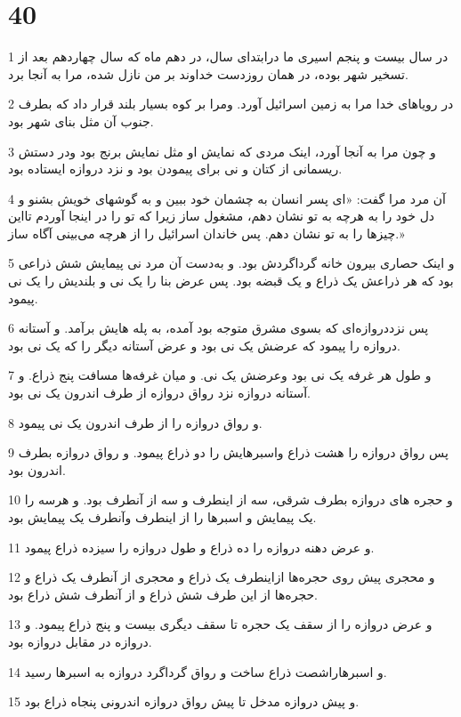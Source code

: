 \chapter{40}

\par 1 در سال بیست و پنجم اسیری ما درابتدای سال، در دهم ماه که سال چهاردهم بعد از تسخیر شهر بوده، در همان روزدست خداوند بر من نازل شده، مرا به آنجا برد.
\par 2 در رویاهای خدا مرا به زمین اسرائیل آورد. ومرا بر کوه بسیار بلند قرار داد که بطرف جنوب آن مثل بنای شهر بود.
\par 3 و چون مرا به آنجا آورد، اینک مردی که نمایش او مثل نمایش برنج بود ودر دستش ریسمانی از کتان و نی برای پیمودن بود و نزد دروازه ایستاده بود.
\par 4 آن مرد مرا گفت: «ای پسر انسان به چشمان خود ببین و به گوشهای خویش بشنو و دل خود را به هرچه به تو نشان دهم، مشغول ساز زیرا که تو را در اینجا آوردم تااین چیزها را به تو نشان دهم. پس خاندان اسرائیل را از هر‌چه می‌بینی آگاه ساز.»
\par 5 و اینک حصاری بیرون خانه گرداگردش بود. و به‌دست آن مرد نی پیمایش شش ذراعی بود که هر ذراعش یک ذراع و یک قبضه بود. پس عرض بنا را یک نی و بلندیش را یک نی پیمود.
\par 6 پس نزددروازه‌ای که بسوی مشرق متوجه بود آمده، به پله هایش برآمد. و آستانه دروازه را پیمود که عرضش یک نی بود و عرض آستانه دیگر را که یک نی بود.
\par 7 و طول هر غرفه یک نی بود وعرضش یک نی. و میان غرفه‌ها مسافت پنج ذراع. و آستانه دروازه نزد رواق دروازه از طرف اندرون یک نی بود.
\par 8 و رواق دروازه را از طرف اندرون یک نی پیمود.
\par 9 پس رواق دروازه را هشت ذراع واسبرهایش را دو ذراع پیمود. و رواق دروازه بطرف اندرون بود.
\par 10 و حجره های دروازه بطرف شرقی، سه از اینطرف و سه از آنطرف بود. و هرسه را یک پیمایش و اسبرها را از اینطرف وآنطرف یک پیمایش بود.
\par 11 و عرض دهنه دروازه را ده ذراع و طول دروازه را سیزده ذراع پیمود.
\par 12 و محجری پیش روی حجره‌ها ازاینطرف یک ذراع و محجری از آنطرف یک ذراع و حجره‌ها از این طرف شش ذراع و از آنطرف شش ذراع بود.
\par 13 و عرض دروازه را از سقف یک حجره تا سقف دیگری بیست و پنج ذراع پیمود. و دروازه در مقابل دروازه بود.
\par 14 و اسبرهاراشصت ذراع ساخت و رواق گرداگرد دروازه به اسبرها رسید.
\par 15 و پیش دروازه مدخل تا پیش رواق دروازه اندرونی پنجاه ذراع بود.
